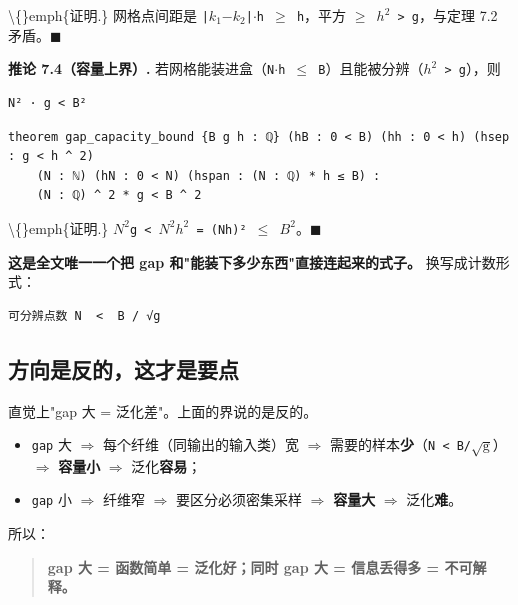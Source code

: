 \documentclass[11pt,a4paper]{ctexart}
\begin{document}
\textbackslash\{\}emph\{证明.\} 网格点间距是 \texttt{|\ensuremath{k_{1}}\ensuremath{-}\ensuremath{k_{2}}|\ensuremath{\cdot}h \ensuremath{\ge} h}，平方 \texttt{\ensuremath{\ge} \ensuremath{h^{2}} > g}，与定理 7.2 矛盾。\ensuremath{\ensuremath{\blacksquare}}

\textbf{推论 7.4（容量上界）.} 若网格能装进盒（\texttt{N\ensuremath{\cdot}h \ensuremath{\le} B}）且能被分辨（\texttt{\ensuremath{h^{2}} > g}），则

\begin{lstlisting}
N² · g < B²
\end{lstlisting}

\begin{lstlisting}
theorem gap_capacity_bound {B g h : ℚ} (hB : 0 < B) (hh : 0 < h) (hsep : g < h ^ 2)
    (N : ℕ) (hN : 0 < N) (hspan : (N : ℚ) * h ≤ B) :
    (N : ℚ) ^ 2 * g < B ^ 2
\end{lstlisting}

\textbackslash\{\}emph\{证明.\} \texttt{\ensuremath{N^{2}}g < \ensuremath{N^{2}}\ensuremath{h^{2}} = (Nh)² \ensuremath{\le} \ensuremath{B^{2}}}。\ensuremath{\ensuremath{\blacksquare}}

\textbf{这是全文唯一一个把 gap 和"能装下多少东西"直接连起来的式子。} 换写成计数形式：

\begin{lstlisting}
可分辨点数 N  <  B / √g
\end{lstlisting}

\subsection{方向是反的，这才是要点}

直觉上"gap 大 = 泛化差"。上面的界说的是反的。

\begin{itemize}
\item \texttt{gap} 大 \ensuremath{\Longrightarrow} 每个纤维（同输出的输入类）宽 \ensuremath{\Longrightarrow} 需要的样本\textbf{少}（\texttt{N < B/\ensuremath{\sqrt{\mathrm{g}}}}）\ensuremath{\Longrightarrow} \textbf{容量小} \ensuremath{\Longrightarrow} 泛化\textbf{容易}；
\item \texttt{gap} 小 \ensuremath{\Longrightarrow} 纤维窄 \ensuremath{\Longrightarrow} 要区分必须密集采样 \ensuremath{\Longrightarrow} \textbf{容量大} \ensuremath{\Longrightarrow} 泛化\textbf{难}。
\end{itemize}

所以：

\begin{quote}
\textbf{gap 大 = 函数简单 = 泛化好；同时 gap 大 = 信息丢得多 = 不可解释。}
\end{quote}
\end{document}
